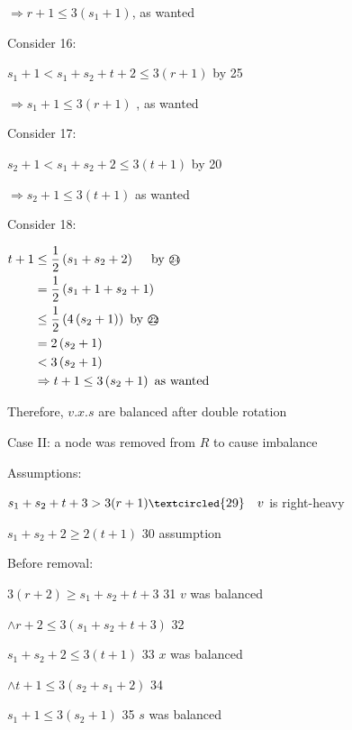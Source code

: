 \documentclass[12pt]{article}
\begin{document}
$\Rightarrow r+1 \leq 3(s_1+1)$, as wanted

Consider {\small\textcircled{\scriptsize{16}}}:

$s_{1}+1  <s_{1}+s_{2}+t + 2 \leq 3(r+1)$ by {\small\textcircled{\scriptsize{25}}}

$\Rightarrow s_{1}+1  \leqslant 3(r+1)$ , as wanted 


Consider {\small\textcircled{\scriptsize{17}}}:

$s_{2}+1<s_{1}+s_{2}+2 \leq 3(t+1)$ by {\small\textcircled{\scriptsize{20}}}

$\Rightarrow s_{2}+1 \leqslant 3(t+1)$ as wanted

Consider {\small\textcircled{\scriptsize{18}}}:

$
\begin{aligned}
 t+1 &\leq \frac{1}{2}\left(s_{1}+s_{2}+2\right) \quad \text { by {\small\textcircled{\scriptsize{24}}}}  \\
&=\frac{1}{2}\left(s_{1}+1+s_{2}+1\right) \\
& \leq \frac{1}{2}\left(4\left(s_{2}+1\right)\right) \text { by {\small\textcircled{\scriptsize{22}}}} \\
&=2\left(s_{2}+1\right) \\
&<3\left(s_{2}+1\right) \\
& \Rightarrow t+1 \leq 3\left(s_{2}+1\right) \text { as wanted }
\end{aligned}
$

Therefore, $v.x.s$ are balanced after double rotation

Case II: a node was removed from $R$ to cause imbalance

Assumptions:

$s_{1}+s_{2} + t+3>3(r+1) {\small\textcircled{\scriptsize{29}}}\quad v$ is right-heavy

$s_{1}+s_{2}+2 \geqslant 2(t+1)$ {\small\textcircled{\scriptsize{30}}} assumption

Before removal:

$3(r+2) \geq s_{1}+s_{2}+t+3$ {\small\textcircled{\scriptsize{31}}} $v$ was balanced 

$\wedge r+2 \leq 3\left(s_{1}+s_{2}+t+3\right)$ {\small\textcircled{\scriptsize{32}}}

$s_{1}+s_{2}+2 \leq 3(t+1)$ {\small\textcircled{\scriptsize{33}}} $x$ was balanced 

$\wedge t+1 \leq 3\left(s_{2}+s_{1}+2\right)$ {\small\textcircled{\scriptsize{34}}} 

$s_{1}+1 \leq 3\left(s_{2}+1\right)$ {\small\textcircled{\scriptsize{35}}} $s$ was balanced 
\end{document}

